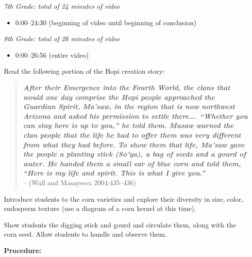 \documentclass[12pt,]{article}
\providecommand{\tightlist}{%
  \setlength{\itemsep}{0pt}\setlength{\parskip}{0pt}}
\begin{document}
\emph{7th Grade: total of 24 minutes of video}

\begin{itemize}
\tightlist
\item
  0:00--24:30 (beginning of video until beginning of conclusion)
\end{itemize}

\emph{8th Grade: total of 26 minutes of video}

\begin{itemize}
\tightlist
\item
  0:00--26:56 (entire video)
\end{itemize}

Read the following portion of the Hopi creation story:

\begin{quote}
\textbf{\emph{After their Emergence into the Fourth World, the clans that would one
day comprise the Hopi people approached the Guardian Spirit, Ma'saw, in
the region that is now northwest Arizona and asked his permission to
settle there\ldots. ``Whether you can stay here is up to you,'' he told them.
Masaw warned the clan people that the life he had to offer them was very
different from what they had before. To show them that life, Ma'saw gave
the people a planting stick (So'ya), a bag of seeds and a gourd of
water. He handed them a small ear of blue corn and told them, ``Here is
my life and spirit. This is what I give you.''}}\\
-- (Wall and Masayesva 2004:435--436)
\end{quote}

Introduce students to the corn varieties and explore their diversity
in size, color, endosperm texture (use a diagram of a corn kernel at
this time).

Show students the digging stick and gourd and circulate them, along
with the corn seed. Allow students to handle and observe them.

\textbf{Procedure:}
\end{document}
